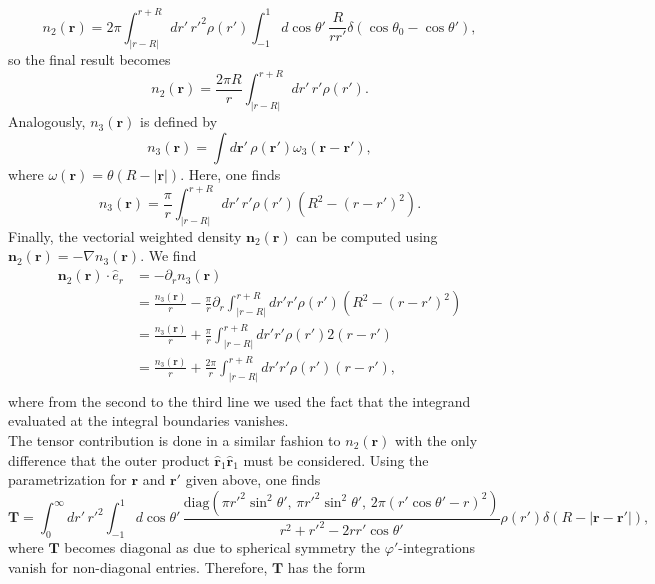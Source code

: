 \documentclass{article}
\begin{document}
\begin{equation}
	n_2(\mathbf{r}) = 2\pi\int_{|r-R|}^{r+R}dr'\,r'^2\rho(r')\int_{-1}^1d\cos\theta'\,\frac{R}{rr'}\delta(\cos\theta_0-\cos\theta'),
\end{equation}
so the final result becomes
\begin{equation}
	n_2(\mathbf{r}) = \frac{2\pi R}{r}\int_{|r-R|}^{r+R}dr'\,r'\rho(r').
\end{equation}
Analogously, $n_3(\mathbf{r})$ is defined by
\begin{equation}
	n_3(\mathbf{r}) = \int d\mathbf{r}'\,\rho(\mathbf{r}')\omega_3(\mathbf{r}-\mathbf{r}'),
\end{equation}
where $\omega(\mathbf{r}) = \theta(R-|\mathbf{r}|)$. Here, one finds 
\begin{equation}
	n_3(\mathbf{r}) = \frac{\pi}{r}\int_{|r-R|}^{r+R} dr'\,r'\rho(r')\left(R^2-(r-r')^2\right).
\end{equation}
Finally, the vectorial weighted density $\mathbf{n}_2(\mathbf{r})$ can be computed using $\mathbf{n}_2(\mathbf{r})=-\nabla n_3(\mathbf{r})$. We find
\begin{align}
	\mathbf{n}_2(\mathbf{r})\cdot \hat{e}_r &= -\partial_r n_3(\mathbf{r})\\\nonumber
	&= \frac{n_3(\mathbf{r})}{r}-\frac{\pi}{r}\partial_r\int_{|r-R|}^{r+R} dr'r'\rho(r')\left(R^2-(r-r')^2\right)\\\nonumber
	&= \frac{n_3(\mathbf{r})}{r}+\frac{\pi}{r}\int_{|r-R|}^{r+R} dr'r'\rho(r')2(r-r')\\\nonumber
	&= \frac{n_3(\mathbf{r})}{r}+\frac{2\pi}{r}\int_{|r-R|}^{r+R} dr'r'\rho(r')(r-r'),\\\nonumber
\end{align}
where from the second to the third line we used the fact that the integrand evaluated at the integral boundaries vanishes.\\
The tensor contribution is done in a similar fashion to $n_2(\mathbf{r})$ with the only difference that the outer product $\hat{\mathbf{r}}_1\hat{\mathbf{r}}_1$ must be considered. Using the parametrization for $\mathbf{r}$ and $\mathbf{r}'$ given above, one finds
\begin{equation}
	\mathbf{T} = \int_0^\infty dr'\,r'^2\int_{-1}^1d\cos\theta'\,\frac{\text{diag}(\pi r'^2\sin^2\theta',\,\pi r'^2\sin^2\theta',\,2\pi(r'\cos\theta'-r)^2)}{r^2+r'^2-2rr'\cos\theta'}\rho(r')\delta(R-|\mathbf{r}-\mathbf{r}'|),
\end{equation}
where $\mathbf{T}$ becomes diagonal as due to spherical symmetry the $\varphi'$-integrations vanish for non-diagonal entries. Therefore, $\mathbf{T}$ has the form
\end{document}
